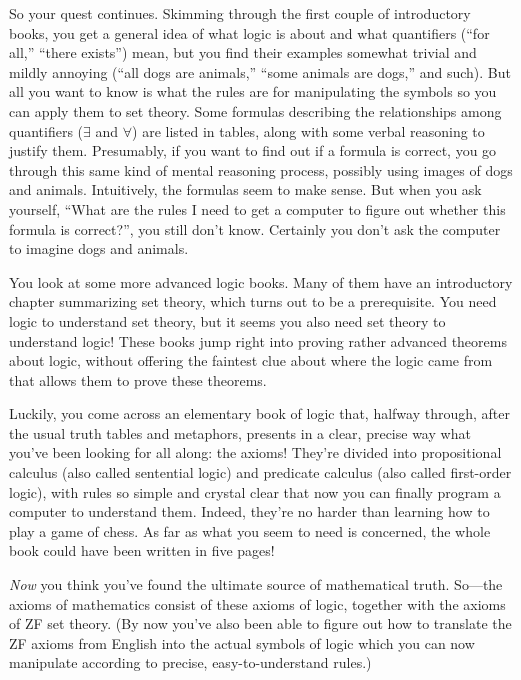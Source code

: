 So your quest continues.  Skimming through the first couple of introductory
books, you get a general idea of what logic is about and what quantifiers
(``for all,'' ``there exists'') mean, but you find their examples somewhat
trivial and mildly annoying (``all dogs are animals,'' ``some animals are
dogs,'' and such).  But all you want to know is what the rules are for
manipulating the symbols so you can apply them to set theory.  Some formulas
describing the relationships among quantifiers ($\exists$ and $\forall$) are
listed in tables, along with some verbal reasoning to justify them.
Presumably, if you want to find out if a formula is correct, you go through
this same kind of mental reasoning process, possibly using images of dogs and
animals. Intuitively, the formulas seem to make sense.  But when you ask
yourself, ``What are the rules I need to get a computer to figure out whether
this formula is correct?'', you still don't know.  Certainly you don't ask the
computer to imagine dogs and animals.

You look at some more advanced logic books.  Many of them have an introductory
chapter summarizing set theory, which turns out to be a prerequisite.  You
need logic to understand set theory, but it seems you also need set theory to
understand logic!  These books jump right into proving rather advanced
theorems about logic, without offering the faintest clue about where the logic
came from that allows them to prove these theorems.

Luckily, you come across an elementary book of logic that, halfway through,
after the usual truth tables and metaphors, presents in a clear, precise way
what you've been looking for all along: the axioms!  They're divided into
propositional calculus (also called sentential logic) and predicate calculus
(also called first-order logic), with rules so simple
and crystal clear that now you can finally program a computer to understand
them.  Indeed, they're no harder than learning how to play a game of chess.
As far as what you seem to need is concerned, the whole book could have been
written in five pages!

{\em Now} you think you've found the ultimate source of mathematical
truth.  So---the axioms of mathematics consist of these axioms of logic,
together with the axioms of ZF set theory. (By now you've also been able to
figure out how to translate the ZF axioms from English into the
actual symbols of logic which you can now manipulate according to
precise, easy-to-understand rules.)

